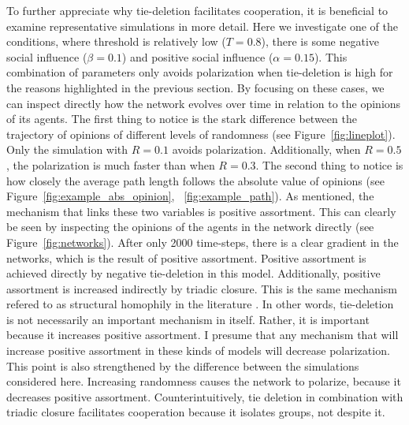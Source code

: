 \documentclass{article}
\begin{document}
To further appreciate why tie-deletion facilitates cooperation, it is beneficial to examine representative simulations in more detail. Here we investigate one of the conditions, where threshold is relatively low ($T = 0.8$), there is some negative social influence ($\beta = 0.1$) and positive social influence ($\alpha = 0.15$). This combination of parameters only avoids polarization when tie-deletion is high for the reasons highlighted in the previous section. By focusing on these cases, we can inspect directly how the network evolves over time in relation to the opinions of its agents. 
The first thing to notice is the stark difference between the trajectory of opinions of different levels of randomness (see Figure~\ref{fig:lineplot}). Only the simulation with $R=0.1$ avoids polarization. Additionally, when $R=0.5$, the polarization is much faster than when $R=0.3$. The second thing to notice is how closely the average path length follows the absolute value of opinions (see Figure~\ref{fig:example_abs_opinion}, ~\ref{fig:example_path}). As mentioned, the mechanism that links these two variables is positive assortment. This can clearly be seen by inspecting the opinions of the agents in the network directly (see Figure~\ref{fig:networks}). After only 2000 time-steps, there is a clear gradient in the networks, which is the result of positive assortment. Positive assortment is achieved directly by negative tie-deletion in this model. Additionally, positive assortment is increased indirectly by triadic closure. This is the same mechanism refered to as structural homophily in the literature \cite{asikainen_cumulative_2020,peixoto_disentangling_2022}. In other words, tie-deletion is not necessarily an important mechanism in itself. Rather, it is important because it increases positive assortment. I presume that any mechanism that will increase positive assortment in these kinds of models will decrease polarization. This point is also strengthened by the difference between the simulations considered here. Increasing randomness causes the network to polarize, because it decreases positive assortment. Counterintuitively, tie deletion in combination with triadic closure facilitates cooperation because it isolates groups, not despite it. 
\end{document}

